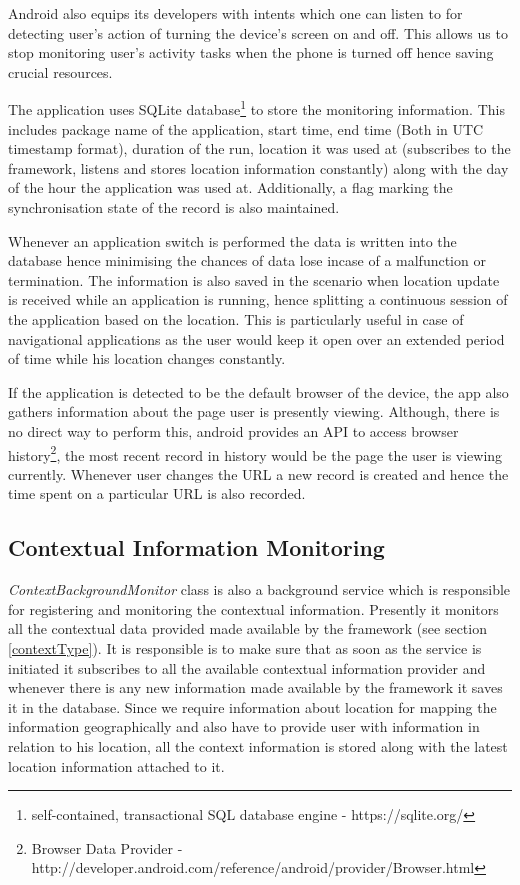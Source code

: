 \documentclass[12pt]{report}
\begin{document}
Android also equips its developers with intents which one can listen to for detecting user's action of turning the device's screen on and off. This allows us to stop monitoring user's activity tasks when the phone is turned off hence saving crucial resources.

The application uses SQLite database\footnote{ self-contained, transactional SQL database engine - https://sqlite.org/} to store the monitoring information. This includes package name of the application, start time, end time (Both in UTC timestamp format), duration of the run, location it was used at (subscribes to the framework, listens and stores location information constantly) along with the day of the hour the application was used at. Additionally, a flag marking the synchronisation state of the record is also maintained. 

Whenever an application switch is performed the data is written into the database hence minimising the chances of data lose incase of a malfunction or termination. The information is also saved in the scenario when location update is received while an application is running, hence splitting a continuous session of the application based on the location. This is particularly useful in case of navigational applications as the user would keep it open over an extended period of time while his location changes constantly.

If the application is detected to be the default browser of the device, the app also gathers information about the page user is presently viewing. Although, there is no direct way to perform this, android provides an API to access browser history\footnote{Browser Data Provider - http://developer.android.com/reference/android/provider/Browser.html}, the most recent record in history would be the page the user is viewing currently. Whenever user changes the URL a new record is created and hence the time spent on a particular URL is also recorded.

\subsection{Contextual Information Monitoring}
\textit{ContextBackgroundMonitor} class is also a background service which is responsible for registering and monitoring the contextual information. Presently it monitors all the contextual data provided made available by the framework (see section \ref{contextType}). It is responsible is to make sure that as soon as the service is initiated it subscribes to all the available contextual information provider and whenever there is any new information made available by the framework it saves it in the database. Since we require information about location for mapping the information geographically and also have to provide user with information in relation to his location, all the context information is stored along with the latest location information attached to it.
\end{document}
